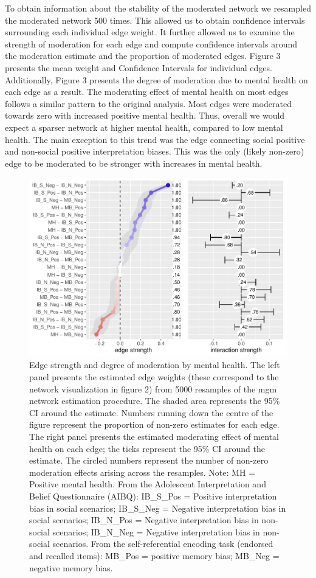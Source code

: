 \documentclass[man,floatsintext]{apa6}
\begin{document}
To obtain information about the stability of the moderated network we resampled the moderated network 500 times. This allowed us to obtain confidence intervals surrounding each individual edge weight. It further allowed us to examine the strength of moderation for each edge and compute confidence intervals around the moderation estimate and the proportion of moderated edges. Figure 3 presents the mean weight and Confidence Intervals for individual edges. Additionally, Figure 3 presents the degree of moderation due to mental health on each edge as a result. The moderating effect of mental health on most edges follows a similar pattern to the original analysis. Most edges were moderated towards zero with increased positive mental health. Thus, overall we would expect a sparser network at higher mental health, compared to low mental health. The main exception to this trend was the edge connecting social positive and non-social positive interpretation biases. This was the only (likely non-zero) edge to be moderated to be stronger with increases in mental health.

\begin{figure}
\centering
\includegraphics{script_files/figure-latex/unnamed-chunk-4-1.pdf}
\caption{\label{fig:unnamed-chunk-4}Edge strength and degree of moderation by mental health. The left panel presents the estimated edge weights (these correspond to the network visualization in figure 2) from 5000 resamples of the mgm network estimation procedure. The shaded area represents the 95\% CI around the estimate. Numbers running down the centre of the figure represent the proportion of non-zero estimates for each edge. The right panel presents the estimated moderating effect of mental health on each edge; the ticks represent the 95\% CI around the estimate. The circled numbers represent the number of non-zero moderation effects arising across the resamples.
Note: MH = Positive mental health. From the Adolescent Interpretation and Belief Questionnaire (AIBQ): IB\_S\_Pos = Positive interpretation bias in social scenarios; IB\_S\_Neg = Negative interpretation bias in social scenarios; IB\_N\_Pos = Negative interpretation bias in non-social scenarios; IB\_N\_Neg = Negative interpretation bias in non-social scenarios. From the self-referential encoding task (endorsed and recalled items): MB\_Pos = positive memory bias; MB\_Neg = negative memory bias.}
\end{figure}
\end{document}
